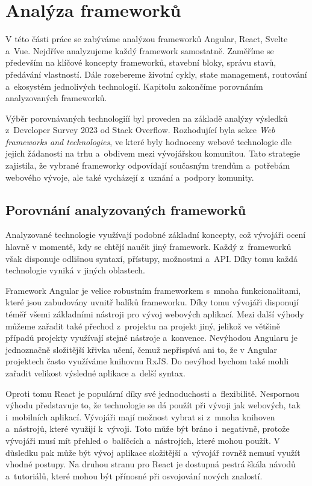 \section{Analýza frameworků}

V této části práce se zabýváme analýzou frameworků Angular, React, Svelte a~Vue. Nejdříve analyzujeme každý framework samostatně. 
Zaměříme se především na klíčové koncepty frameworků, stavební bloky, správu stavů, předávání vlastností. 
Dále rozebereme životní cykly, state management, routování a~ekosystém jednolivých technologií. 
Kapitolu zakončíme porovnáním analyzovaných frameworků.

Výběr porovnávaných technologiíí byl proveden na základě analýzy výsledků z~Developer Survey 2023 od Stack Overflow. 
Rozhodující byla sekce \emph{Web frameworks and technologies}, ve které byly hodnoceny webové technologie dle jejich žádanosti na trhu a~obdivem mezi vývojářskou komunitou. 
Tato strategie zajistila, že vybrané frameworky odpovídají současným trendům a~potřebám webového vývoje, ale také vycházejí z~uznání a~podpory komunity.\cite{stackoverflow, developersurvey}







\subsection{Porovnání analyzovaných frameworků}

Analyzované technologie využívají podobné základní koncepty, což vývojáři ocení hlavně v momentě, kdy se chtějí naučit jiný framework. 
Každý z~frameworků však disponuje odlišnou syntaxí, přístupy, možnostmi a~API. Díky tomu každá technologie vyniká v jiných oblastech.

Framework Angular je velice robustním frameworkem s~mnoha funkcionalitami, které jsou zabudovány uvnitř balíků frameworku. 
Díky tomu vývojáři disponují téměř všemi základními nástroji pro vývoj webových aplikací. 
Mezi další výhody můžeme zařadit také přechod z~projektu na projekt jiný, jelikož ve většině případů projekty využívají stejné nástroje a~konvence. 
Nevýhodou Angularu je jednoznačně složitější křivka učení, čemuž nepřispívá ani to, že v Angular projektech často využíváme knihovnu RxJS. 
Do nevýhod bychom také mohli zařadit velikost výsledné aplikace a~delší syntax.

Oproti tomu React je populární díky své jednoduchosti a~flexibilitě. 
Nespornou výhodu představuje to, že technologie se dá použít při vývoji jak webových, tak i~mobilních aplikací. 
Vývojáři mají možnost vybrat si z~mnoha knihoven a~nástrojů, které využijí k~vývoji. 
Toto může být bráno i~negativně, protože vývojáři musí mít přehled o~balíčcích a~nástrojích, které mohou použít. 
V důsledku pak může být vývoj aplikace složitější a~vývojář rovněž nemusí využít vhodné postupy. 
Na druhou stranu pro React je dostupná pestrá škála návodů a~tutoriálů, které mohou být přínosné při osvojování nových znalostí.

